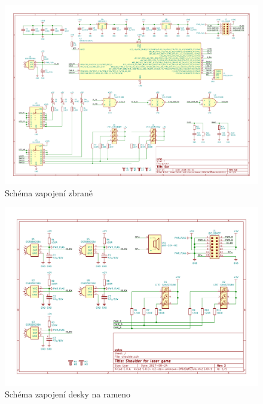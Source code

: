 \begin{landscape}
    \begin{figure}[h]
        \centering
        \includegraphics[page=1, height=\textwidth]{sch/gun}
        \caption{Schéma zapojení zbraně}
    \end{figure}
\end{landscape}


\begin{landscape}
    \begin{figure}[h]
        \centering
        \includegraphics[page=1, height=\textwidth]{sch/shoulder}
        \caption{Schéma zapojení desky na rameno}
    \end{figure}
\end{landscape}


